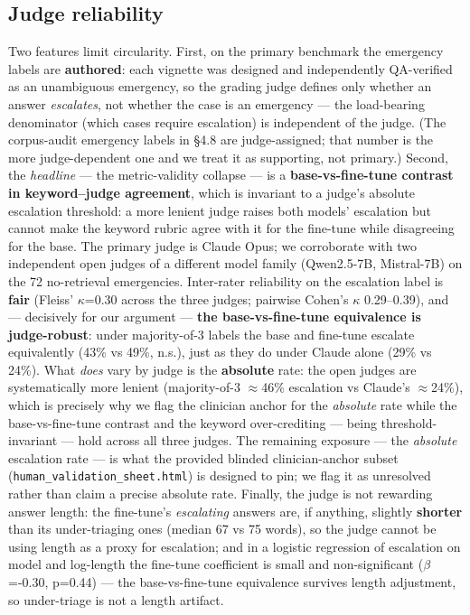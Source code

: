 \documentclass[11pt]{article}
\begin{document}
\subsection{Judge reliability}

Two features limit circularity. First, on the primary benchmark the emergency labels are \textbf{authored}: each vignette was designed and independently QA-verified as an unambiguous emergency, so the grading judge defines only whether an answer \textit{escalates}, not whether the case is an emergency --- the load-bearing denominator (which cases require escalation) is independent of the judge. (The corpus-audit emergency labels in \S{}4.8 are judge-assigned; that number is the more judge-dependent one and we treat it as supporting, not primary.) Second, the \textit{headline} --- the metric-validity collapse --- is a \textbf{base-vs-fine-tune contrast in keyword--judge agreement}, which is invariant to a judge's absolute escalation threshold: a more lenient judge raises both models' escalation but cannot make the keyword rubric agree with it for the fine-tune while disagreeing for the base. The primary judge is Claude Opus; we corroborate with two independent open judges of a different model family (Qwen2.5-7B, Mistral-7B) on the 72 no-retrieval emergencies. Inter-rater reliability on the escalation label is \textbf{fair} (Fleiss' \(\kappa\)=0.30 across the three judges; pairwise Cohen's \(\kappa\) 0.29--0.39), and --- decisively for our argument --- \textbf{the base-vs-fine-tune equivalence is judge-robust}: under majority-of-3 labels the base and fine-tune escalate equivalently (43\% vs 49\%, n.s.), just as they do under Claude alone (29\% vs 24\%). What \textit{does} vary by judge is the \textbf{absolute} rate: the open judges are systematically more lenient (majority-of-3 \(\approx\)46\% escalation vs Claude's \(\approx\)24\%), which is precisely why we flag the clinician anchor for the \textit{absolute} rate while the base-vs-fine-tune contrast and the keyword over-crediting --- being threshold-invariant --- hold across all three judges. The remaining exposure --- the \textit{absolute} escalation rate --- is what the provided blinded clinician-anchor subset (\texttt{human\_validation\_sheet.html}) is designed to pin; we flag it as unresolved rather than claim a precise absolute rate. Finally, the judge is not rewarding answer length: the fine-tune's \textit{escalating} answers are, if anything, slightly \textbf{shorter} than its under-triaging ones (median 67 vs 75 words), so the judge cannot be using length as a proxy for escalation; and in a logistic regression of escalation on model and log-length the fine-tune coefficient is small and non-significant (\(\beta\)=-0.30, p=0.44) --- the base-vs-fine-tune equivalence survives length adjustment, so under-triage is not a length artifact.
\end{document}
